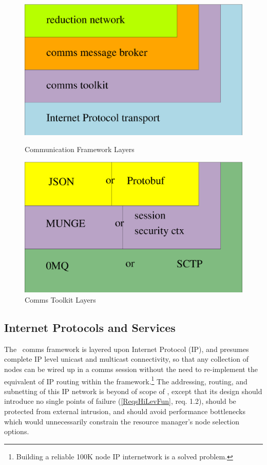 \begin{figure}
\begin{minipage}[b]{0.45\linewidth}
\centering
\includegraphics[scale=0.30]{../fig/comms.eps}
\caption{Communication Framework Layers}
\label{FigCommsLayers}
\end{minipage}
\hspace{0.5cm}
\begin{minipage}[b]{0.45\linewidth}
\centering
\includegraphics[scale=0.30]{../fig/commstk.eps}
\caption{Comms Toolkit Layers}
\label{FigCommsTK}
\end{minipage}
\end{figure}

\subsection{Internet Protocols and Services}
\label{sect:commsIP}

The \ngrm\ comms framework is layered upon Internet Protocol (IP), and presumes
complete IP level unicast and multicast connectivity, so that any
collection of nodes can be wired up in a comms session without
the need to re-implement the equivalent of IP routing within
the framework.\footnote{Building a reliable 100K node IP internetwork
is a solved problem.} 
The addressing, routing, and subnetting of this IP network is beyond of
scope of \ngrm, except that its design should introduce no single
points of failure (\ref{ReqsHiLevFun}, req. 1.2), should be protected
from external intrusion, and should avoid performance bottlenecks which
would unnecessarily constrain the resource manager's node selection options.

